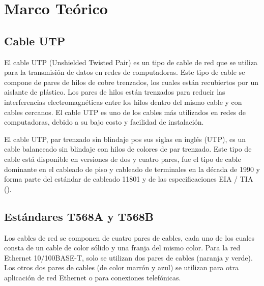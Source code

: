 


\section{Marco Teórico}
    \subsection{Cable UTP}

    El cable UTP (Unshielded Twisted Pair) es un tipo de cable de red que se utiliza para la transmisión de datos en redes de computadoras. Este tipo de cable se compone de pares de hilos de cobre trenzados, los cuales están recubiertos por un aislante de plástico. Los pares de hilos están trenzados para reducir las interferencias electromagnéticas entre los hilos dentro del mismo cable y con cables cercanos. El cable UTP es uno de los cables más utilizados en redes de computadoras, debido a su bajo costo y facilidad de instalación.

    El cable UTP, par trenzado sin blindaje pos sus siglas en inglés (UTP), es un cable balanceado sin blindaje con hilos de colores de par trenzado. Este tipo de cable está disponible en versiones de dos y cuatro pares, fue el tipo de cable dominante en el cableado de piso y cableado de terminales en la década de 1990 y forma parte del estándar de cableado 11801 y de las especificaciones EIA / TIA (\cite{Castro_2023}).

    \subsection{Estándares T568A y T568B}
    Los cables de red se componen de cuatro pares de cables, cada uno de los cuales consta de un cable de color sólido y una franja del mismo color. Para la red Ethernet 10/100BASE-T, solo se utilizan dos pares de cables (naranja y verde). Los otros dos pares de cables (de color marrón y azul) se utilizan para otra aplicación de red Ethernet o para conexiones telefónicas.

